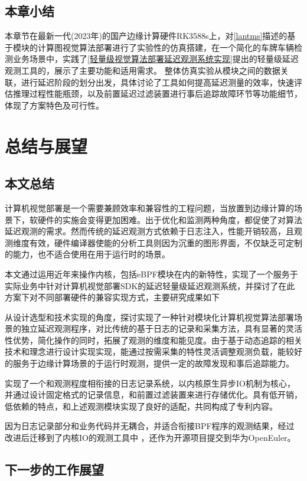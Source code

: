 \documentclass[master,anonymous]{shtthesis}
\begin{document}
\section{本章小结}
本章节在最新一代(2023年)的国产边缘计算硬件RK3588s上，对\ref{lantms}描述的基于模块的计算图视觉算法部署进行了实验性的仿真搭建，在一个简化的车牌车辆检测业务场景中，实践了\ref{轻量级视觉算法部署延迟观测系统实现}提出的轻量级延迟观测工具的，展示了主要功能和适用需求。
整体仿真实验从模块之间的数据关联，进行延迟阶段的划分出发，具体讨论了工具如何提高延迟测量的效率，快速评估推理过程性能瓶颈，以及前置延迟过滤装置进行事后追踪故障环节等功能细节，体现了方案特色及可行性。

\chapter{总结与展望}
\section{本文总结}
计算机视觉部署是一个需要兼顾效率和兼容性的工程问题，当放置到边缘计算的场景下，软硬件的实施会变得更加困难。出于优化和监测两种角度，都促使了对算法延迟观测的需求。然而传统的延迟观测方式依赖于日志注入，性能开销较高，且观测维度有效，硬件编译器使能的分析工具则因为沉重的图形界面，不仅缺乏可定制的能力，也不适合使用在用于运行时的场景。

本文通过运用近年来操作内核，包括eBPF模块在内的新特性，实现了一个服务于实际业务中针对计算机视觉部署SDK的延迟轻量级延迟观测系统，并探讨了在此方案下对不同部署硬件的兼容实现方式，主要研究成果如下

从设计选型和技术实现的角度，探讨实现了一种针对模块化计算机视觉算法部署场景的独立延迟观测程序，对比传统的基于日志的记录和采集方法，具有显著的灵活性优势，简化操作的同时，拓展了观测的维度和能见度。由于基于动态追踪的相关技术和理念进行设计实现实现，能通过按需采集的特性灵活调整观测负载，能较好的服务于边缘计算场景的于运行时观测，提供一定的故障发现和事后追踪能力。

实现了一个和观测程度相衔接的日志记录系统，以内核原生异步IO机制为核心，并通过设计固定格式的记录信息，和前置过滤装置来进行存储优化。具有低开销，低依赖的特点，和上述观测模块实现了良好的适配，共同构成了专利\cite{patent}内容。

因为日志记录部分和业务代码并无耦合，并适合衔接BPF程序的观测结果，经过改进后迁移到了内核IO的观测工具中 ，还作为开源项目提交到华为OpenEuler。
\section{下一步的工作展望}
\end{document}
